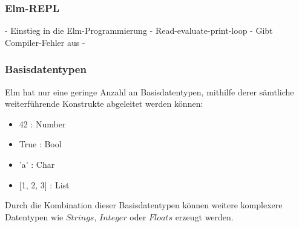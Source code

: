 \subsubsection{Elm-REPL}
\label{sec:elm-repl}
- Einstieg in die Elm-Programmierung
- Read-evaluate-print-loop
- Gibt Compiler-Fehler aus
- 


\subsubsection{Basisdatentypen}
\label{sec:Basisdatentypen}
Elm hat nur eine geringe Anzahl an Basisdatentypen, mithilfe derer sämtliche weiterführende Konstrukte abgeleitet werden können:
\begin{itemize}
	\item 42 : Number
	\item True : Bool
	\item 'a' : Char
	\item {[1, 2, 3] : List}
\end{itemize}
Durch die Kombination dieser Basisdatentypen können weitere komplexere Datentypen wie $Strings$, $Integer$ oder $Floats$ erzeugt werden.

